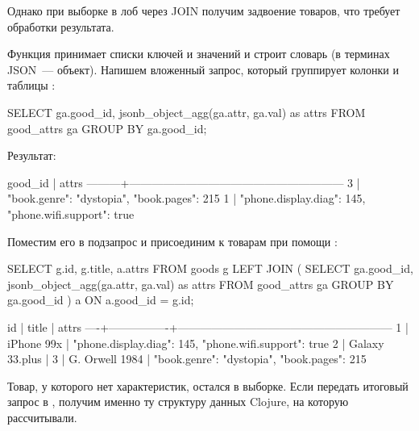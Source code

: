 Однако при выборке в лоб через JOIN получим задвоение товаров, что требует обработки результата.

Функция  принимает списки ключей и значений и строит словарь (в терминах JSON~--- объект). Напишем вложенный запрос, который группирует колонки  и  таблицы :

\begin{english}
  \begin{clojure}
SELECT
  ga.good_id,
  jsonb_object_agg(ga.attr, ga.val) as attrs
FROM good_attrs ga
  GROUP BY ga.good_id;
  \end{clojure}
\end{english}

Результат:

\begin{english}
  \begin{text}
 good_id |                          attrs
---------+---------------------------------------------------------
       3 | {"book.genre": "dystopia", "book.pages": 215}
       1 | {"phone.display.diag": 145, "phone.wifi.support": true}
  \end{text}
\end{english}

Поместим его в подзапрос и присоединим к товарам при помощи :

\begin{english}
  \begin{sql}
SELECT
  g.id,
  g.title,
  a.attrs
FROM
  goods g
LEFT JOIN (
  SELECT
    ga.good_id,
    jsonb_object_agg(ga.attr, ga.val) as attrs
  FROM good_attrs ga
    GROUP BY ga.good_id
) a ON a.good_id = g.id;
  \end{sql}
\end{english}

\begin{english}
  \begin{text}
 id |     title      |                          attrs
----+----------------+---------------------------------------------------------
  1 | iPhone 99x     | {"phone.display.diag": 145, "phone.wifi.support": true}
  2 | Galaxy 33.plus |
  3 | G. Orwell 1984 | {"book.genre": "dystopia", "book.pages": 215}
  \end{text}
\end{english}

Товар, у которого нет характеристик, остался в выборке. Если передать итоговый запрос в , получим именно ту структуру данных Clojure, на которую рассчитывали.

